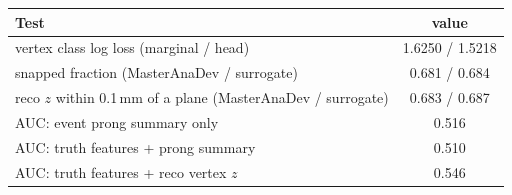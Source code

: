 \begin{tabular}{lc}
\toprule
Test & value \\
\midrule
vertex class log loss (marginal / head) & 1.6250 / 1.5218 \\
snapped fraction (MasterAnaDev / surrogate) & 0.681 / 0.684 \\
reco $z$ within 0.1\,mm of a plane (MasterAnaDev / surrogate) & 0.683 / 0.687 \\
\midrule
AUC: event prong summary only & 0.516 \\
AUC: truth features + prong summary & 0.510 \\
AUC: truth features + reco vertex $z$ & 0.546 \\
\bottomrule
\end{tabular}
